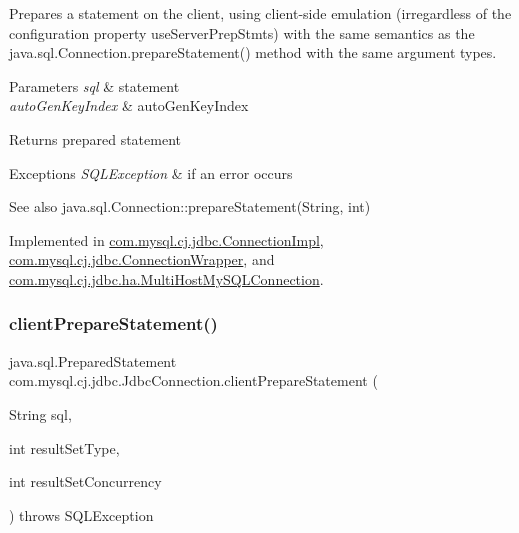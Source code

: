 Prepares a statement on the client, using client-\/side emulation (irregardless of the configuration property \textquotesingle{}use\+Server\+Prep\+Stmts\textquotesingle{}) with the same semantics as the java.\+sql.\+Connection.\+prepare\+Statement() method with the same argument types.


\begin{DoxyParams}{Parameters}
{\em sql} & statement \\
\hline
{\em auto\+Gen\+Key\+Index} & auto\+Gen\+Key\+Index \\
\hline
\end{DoxyParams}
\begin{DoxyReturn}{Returns}
prepared statement 
\end{DoxyReturn}

\begin{DoxyExceptions}{Exceptions}
{\em S\+Q\+L\+Exception} & if an error occurs \\
\hline
\end{DoxyExceptions}
\begin{DoxySeeAlso}{See also}
java.\+sql.\+Connection\+::prepare\+Statement(\+String, int) 
\end{DoxySeeAlso}


Implemented in \mbox{\hyperlink{classcom_1_1mysql_1_1cj_1_1jdbc_1_1_connection_impl_ac15baa66a2fe559cb558a0afd9c7cc03}{com.\+mysql.\+cj.\+jdbc.\+Connection\+Impl}}, \mbox{\hyperlink{classcom_1_1mysql_1_1cj_1_1jdbc_1_1_connection_wrapper_a1dc0327172d67ed88fce75b54c5a87d8}{com.\+mysql.\+cj.\+jdbc.\+Connection\+Wrapper}}, and \mbox{\hyperlink{classcom_1_1mysql_1_1cj_1_1jdbc_1_1ha_1_1_multi_host_my_s_q_l_connection_a384dc86ad7784b2b6f87d74e9242e248}{com.\+mysql.\+cj.\+jdbc.\+ha.\+Multi\+Host\+My\+S\+Q\+L\+Connection}}.

\mbox{\label{interfacecom_1_1mysql_1_1cj_1_1jdbc_1_1_jdbc_connection_a55c0d38bcf8ca54ed272a0a1bbbf7e4c}} 
\subsubsection{\texorpdfstring{client\+Prepare\+Statement()}{clientPrepareStatement()}\hspace{0.1cm}{\footnotesize\ttfamily [3/6]}}
{\footnotesize\ttfamily java.\+sql.\+Prepared\+Statement com.\+mysql.\+cj.\+jdbc.\+Jdbc\+Connection.\+client\+Prepare\+Statement (\begin{DoxyParamCaption}\item[{String}]{sql,  }\item[{int}]{result\+Set\+Type,  }\item[{int}]{result\+Set\+Concurrency }\end{DoxyParamCaption}) throws S\+Q\+L\+Exception}

